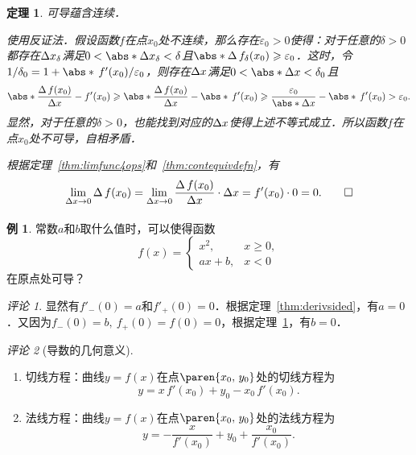 \documentclass[a4paper,punct=CCT]{ctexbook}
\makeatletter
\newtheorem{theorem}{定理}
\theoremstyle{definition}
\newtheorem*{example*}{例}
\theoremstyle{remark}
\newtheorem*{remark}{评论}
\renewcommand*{\proofname}{证}
\renewenvironment{proof}[1][\proofname]{\par
  \pushQED{\qed}%
  \normalfont \topsep6\p@\@plus6\p@\relax
  \trivlist
  \item[\hskip\labelsep
    \bfseries
    #1%
    ]\ignorespaces
}{%
  \popQED\endtrivlist\@endpefalse
}
\let\geq\geqslant
\let\ge\geq}
\makeatother
\begin{document}
\begin{theorem}
  \label{thm:deriv2cont}
  可导蕴含连续．

  \begin{proof}
    使用反证法．假设函数\(f\)在点\(x_0\)处不连续，那么存在\(\varepsilon_0 > 0\)使得：对于任意的\(\delta > 0\)都存在\(\mathop{}\!\Delta x_\delta\)满足\(0 < \abs*{\fwdf x_\delta} < \delta\)且\(\abs*{\fwdf\,f_\delta(x_0)} \ge \varepsilon_0\)．这时，令\(1/\delta_0 = 1 + \abs*{\,f'(x_0)}/\varepsilon_0\)，则存在\(\mathop{}\!\Delta x\)满足\(0 < \abs*{\fwdf x} < \delta_0\)且
    \begin{equation*}
      \abs*{\frac{\fwdf\,f(x_0)}{\fwdf x} - f'(x_0)}
      \ge \abs*{\frac{\fwdf\,f(x_0)}{\fwdf x}} - \abs*{\,f'(x_0)}
      \ge \frac{\varepsilon_0}{\abs*{\fwdf x}} - \abs*{\,f'(x_0)}
      > \varepsilon_0.
    \end{equation*}
    显然，对于任意的\(\delta > 0\)，也能找到对应的\(\mathop{}\!\Delta x\)使得上述不等式成立．所以函数\(f\)在点\(x_0\)处不可导，自相矛盾．
  \end{proof}
  \begin{proof}
    根据定理~\ref{thm:limfunc4ops}和~\ref{thm:contequivdefn}，有
    \begin{equation*}
      \lim_{\fwdf x \to 0} \fwdf\,f(x_0)
      = \lim_{\fwdf x \to 0} \frac{\fwdf\,f(x_0)}{\fwdf x} \cdot \fwdf x
      = f'(x_0) \cdot 0 = 0. \rule[-2.5ex]{0ex}{0ex}
      \qedhere
    \end{equation*}
  \end{proof}
\end{theorem}

\begin{example*}
  常数\(a\)和\(b\)取什么值时，可以使得函数
  \begin{equation*}
    f(x) =
    \begin{cases}
      x^2, & x \ge 0, \\
      ax+b, & x < 0
    \end{cases}
  \end{equation*}
  在原点处可导？

  \begin{remark}
    显然有\(f'_-(0) = a\)和\(f'_+(0) = 0\)．根据定理~\ref{thm:derivsided}，有\(a = 0\)．又因为\(f_-(0) = b,\ f_+(0) = f(0) = 0\)，根据定理~\ref{thm:deriv2cont}，有\(b = 0\)．
  \end{remark}
\end{example*}

\begin{remark}[导数的几何意义]
  \label{rem:derivgeom}
  \leavevmode
  \begin{enumerate}
  \item 切线方程：曲线\(y = f(x)\)在点\(\paren{x_0, \,y_0}\)处的切线方程为
    \begin{equation*}
      y = x\,f'(x_0) + y_0 - x_0\,f'(x_0).
    \end{equation*}
  \item 法线方程：曲线\(y = f(x)\)在点\(\paren{x_0, \,y_0}\)处的法线方程为
    \begin{equation*}
      y = - \frac{x}{f'(x_0)} + y_0 + \frac{x_0}{f'(x_0)}.
    \end{equation*}
  \end{enumerate}
\end{remark}
\end{document}
